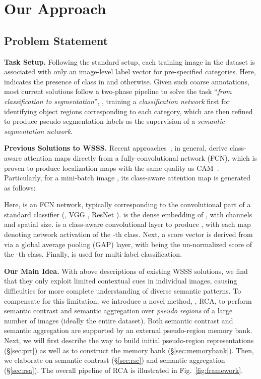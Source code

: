 \documentclass[10pt,twocolumn,letterpaper]{article}
\begin{document}
\section{Our Approach}\label{sec:method}


\subsection{Problem Statement}\label{sec:prob}



\noindent\textbf{Task Setup.}  Following the standard setup, each training image  in the dataset  is associated with only an image-level label vector  for  pre-specified  categories. Here,  indicates the presence of class  in  and  otherwise. Given such coarse annotations, most current solutions follow a  two-phase pipeline to solve the task ``\textit{from classification to segmentation}'', \ie, training a \textit{classification network} first for identifying object regions corresponding to each category, which are then refined to produce pseudo segmentation labels as the supervision of a \textit{semantic segmentation network}. 




\noindent\textbf{Previous Solutions to \mbox{WSSS}.} 
Recent approaches~\cite{jiang2019integral,Zhang_2018,lee2021railroad}, in general, derive class-aware attention maps directly from a fully-convolutional network (\mbox{FCN}), which is proven to produce localization maps with the same quality as \mbox{CAM}~\cite{Zhang_2018}. Particularly, for a mini-batch image , its class-aware attention map  is generated as follows:

Here,  is an FCN network, typically corresponding to the convolutional part of a standard classifier (\eg, VGG \cite{simonyan2014very}, ResNet \cite{he2016deep}).   is the dense  embedding of , with  channels and  spatial size.  is a class-aware convolutional layer to produce , with each map  denoting network activation of the -th class. Next, a score vector  is derived from  via a global average pooling (GAP) layer, with  being the un-normalized score of the -th class. Finally,  is used for multi-label classification.


\noindent\textbf{Our Main Idea.} 
With above  descriptions of existing WSSS solutions, we find that they only exploit limited contextual cues in individual images, causing difficulties for more complete understanding of diverse semantic patterns.  To compensate for this limitation, we introduce a novel method, \ie, RCA, to perform semantic contrast and semantic aggregation over \textit{pseudo regions} of a large number of images (ideally the entire dataset). Both semantic contrast and semantic aggregation are supported by an external pseudo-region memory bank. Next, we will first describe the way to build initial pseudo-region representations (\S\ref{sec:prr}) as well as to construct the memory bank (\S\ref{sec:memorybank}). Then, we elaborate on semantic contrast (\S\ref{sec:rsc}) and semantic aggregation (\S\ref{sec:rsa}). The overall pipeline of RCA is illustrated in Fig.~\ref{fig:framework}. 
\end{document}

